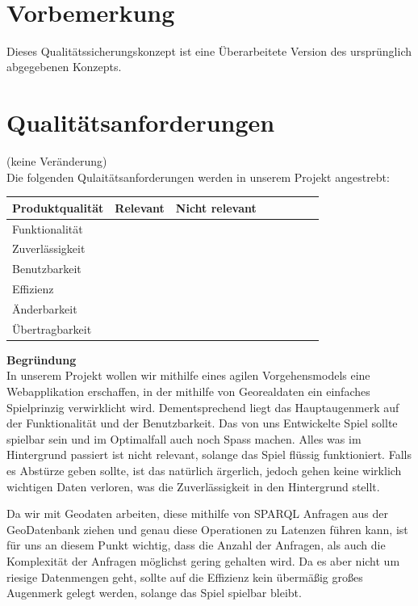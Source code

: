 \documentclass[11pt,a4paper]{article}
\newcommand{\cmark}{\ding{51}}%
\begin{document}
 \\

\tableofcontents

\flushleft
\section{Vorbemerkung}
Dieses Qualitätssicherungskonzept ist eine Überarbeitete Version des ursprünglich abgegebenen Konzepts.
\section{Qualitätsanforderungen}
(keine Veränderung)\\
Die folgenden Qulaitätsanforderungen werden in unserem Projekt angestrebt:
\begin{center}
    \begin{tabular}{ | l | c | c | c | c | c | c | c | }
    \hline
     Produktqualität & Relevant & Nicht relevant \\ \hline
	 Funktionalität   & \cmark & \\ \hline
	 Zuverlässigkeit  &  & \cmark  \\ \hline	
	 Benutzbarkeit & \cmark &  \\ \hline
	 Effizienz & & \cmark  \\ \hline
	 Änderbarkeit &  \cmark &  \\ \hline
	 Übertragbarkeit &  \cmark & \\ \hline
	 
    \end{tabular}
\end{center}
\textbf{Begründung} \\
In unserem Projekt wollen wir mithilfe eines agilen Vorgehensmodels eine Webapplikation erschaffen, in der mithilfe von Georealdaten ein einfaches Spielprinzig verwirklicht wird. 
Dementsprechend liegt das Hauptaugenmerk auf der Funktionalität und der Benutzbarkeit.
Das von uns Entwickelte Spiel sollte spielbar sein und im Optimalfall auch noch Spass machen.
Alles was im Hintergrund passiert ist nicht relevant, solange das Spiel flüssig funktioniert.
Falls es Abstürze geben sollte, ist das natürlich ärgerlich, jedoch gehen keine wirklich wichtigen Daten verloren, was die Zuverlässigkeit in den Hintergrund stellt.

Da wir mit Geodaten arbeiten, diese mithilfe von SPARQL Anfragen aus der GeoDatenbank ziehen und genau diese Operationen zu Latenzen führen kann, ist für uns an diesem Punkt wichtig, dass die Anzahl der Anfragen, als auch die Komplexität der Anfragen möglichst gering gehalten wird.
Da es aber nicht um riesige Datenmengen geht, sollte auf die Effizienz kein übermäßig großes Augenmerk gelegt werden, solange das Spiel spielbar bleibt.
\end{document}
